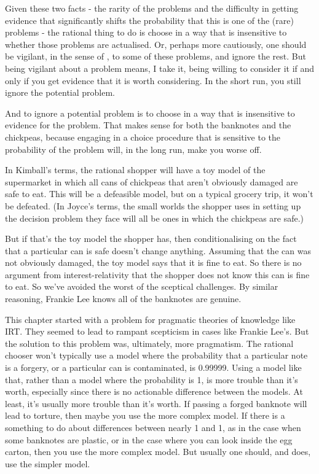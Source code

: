 \documentclass[11pt,]{book}
\begin{document}
Given these two facts - the rarity of the problems and the difficulty in getting evidence that significantly shifts the probability that this is one of the (rare) problems - the rational thing to do is choose in a way that is insensitive to whether those problems are actualised. Or, perhaps more cautiously, one should be vigilant, in the sense of \citet{SperberEtAl2010}, to some of these problems, and ignore the rest. But being vigilant about a problem means, I take it, being willing to consider it if and only if you get evidence that it is worth considering. In the short run, you still ignore the potential problem.

And to ignore a potential problem is to choose in a way that is insensitive to evidence for the problem. That makes sense for both the banknotes and the chickpeas, because engaging in a choice procedure that is sensitive to the probability of the problem will, in the long run, make you worse off.

In Kimball's terms, the rational shopper will have a toy model of the supermarket in which all cans of chickpeas that aren't obviously damaged are safe to eat. This will be a defeasible model, but on a typical grocery trip, it won't be defeated. (In Joyce's terms, the small worlds the shopper uses in setting up the decision problem they face will all be ones in which the chickpeas are safe.)

But if that's the toy model the shopper has, then conditionalising on the fact that a particular can is safe doesn't change anything. Assuming that the can was not obviously damaged, the toy model says that it is fine to eat. So there is no argument from interest-relativity that the shopper does not know this can is fine to eat. So we've avoided the worst of the sceptical challenges. By similar reasoning, Frankie Lee knows all of the banknotes are genuine.

This chapter started with a problem for pragmatic theories of knowledge like IRT. They seemed to lead to rampant scepticism in cases like Frankie Lee's. But the solution to this problem was, ultimately, more pragmatism. The rational chooser won't typically use a model where the probability that a particular note is a forgery, or a particular can is contaminated, is 0.99999. Using a model like that, rather than a model where the probability is 1, is more trouble than it's worth, especially since there is no actionable difference between the models. At least, it's usually more trouble than it's worth. If passing a forged banknote will lead to torture, then maybe you use the more complex model. If there is a something to do about differences between nearly 1 and 1, as in the case when some banknotes are plastic, or in the case where you can look inside the egg carton, then you use the more complex model. But usually one should, and does, use the simpler model.
\end{document}
